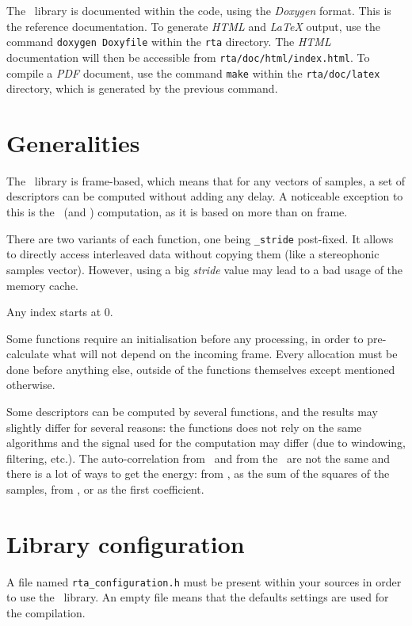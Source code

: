 \documentclass[a4paper, twoside]{article}
\begin{document}
The \rta\ library is documented within the code, using the
\textit{Doxygen} format. This is the reference documentation. To
generate \textit{HTML} and \textit{LaTeX} output, use the command
\texttt{doxygen Doxyfile} within the \texttt{rta} directory.  The
\textit{HTML} documentation will then be accessible from
\texttt{rta/doc/html/index.html}. To compile a \textit{PDF} document,
use the command \texttt{make} within the \texttt{rta/doc/latex}
directory, which is generated by the previous command.

\section{Generalities}
\label{sec:generalities}

The \rta\ library is frame-based, which means that for any vectors of
samples, a set of descriptors can be computed without adding any
delay. A noticeable exception to this is the \del\ (and
\ddel) computation, as it is based on more than on frame.

There are two variants of each function, one being \texttt{\_stride}
post-fixed. It allows to directly access interleaved data without
copying them (like a stereophonic samples vector). However, using a
big \emph{stride} value may lead to a bad usage of the memory cache.

Any index starts at 0.

Some functions require an initialisation before any processing, in
order to pre-calculate what will not depend on the incoming
frame. Every allocation must be done before anything else, outside of
the functions themselves except mentioned otherwise.

Some descriptors can be computed by several functions, and the results
may slightly differ for several reasons: the functions does not rely
on the same algorithms and the signal used for the computation may
differ (due to windowing, filtering, etc.). The auto-correlation from
\yin\ and from the \lpc\ are not the same and there is a
lot of ways to get the energy: from \yin, as the sum of the
squares of the samples, from \lpc, or as the first
\mfcc coefficient.

\section{Library configuration}
\label{sec:configuration}

A file named \texttt{rta\_configuration.h} must be present within your
sources in order to use the \rta\ library. An empty file means that
the defaults settings are used for the compilation. 
\end{document}
